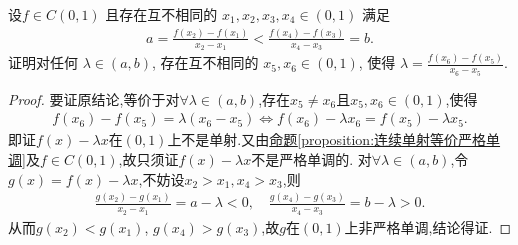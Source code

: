 \documentclass[../../main.tex]{subfiles}%
\begin{document}
\begin{example}
设$f \in C(0,1)$ 且存在互不相同的 $x_1, x_2, x_3, x_4 \in (0,1)$ 满足
\begin{align*}
a = \frac{f(x_2) - f(x_1)}{x_2 - x_1} < \frac{f(x_4) - f(x_3)}{x_4 - x_3} = b.
\end{align*}
证明对任何 $\lambda \in (a, b)$, 存在互不相同的 $x_5, x_6 \in (0,1)$, 使得 $\lambda = \frac{f(x_6) - f(x_5)}{x_6 - x_5}$.
\end{example}
\begin{proof}
要证原结论,等价于对$\forall \lambda \in (a,b)$,存在$x_5 \ne x_6$且$x_5,x_6 \in (0,1)$,使得
\begin{align*}
f(x_6) -f(x_5) = \lambda (x_6-x_5) \iff f(x_6) -\lambda x_6=f(x_5) -\lambda x_5.
\end{align*}
即证$f(x) -\lambda x$在$(0,1)$上不是单射.又由\hyperref[proposition:连续单射等价严格单调]{命题\ref{proposition:连续单射等价严格单调}}及$f\in C(0,1)$,故只须证$f(x) -\lambda x$不是严格单调的.
对$\forall \lambda \in (a,b)$,令$g(x) =f(x) -\lambda x$,不妨设$x_2>x_1,x_4>x_3$,则  
\begin{align*}
\frac{g(x_2) -g(x_1)}{x_2-x_1}=a-\lambda <0,\quad \frac{g(x_4) -g(x_3)}{x_4-x_3}=b-\lambda >0.
\end{align*}
从而$g(x_2) <g(x_1)$, $g(x_4) >g(x_3)$,故$g$在$(0,1)$上非严格单调,结论得证.
\end{proof}
\end{document}
